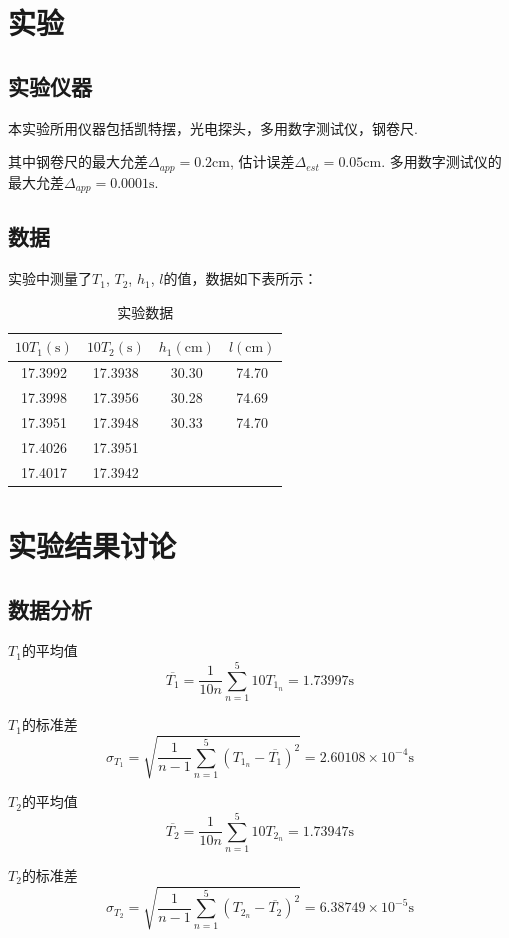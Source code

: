 \documentclass[UTF8]{ctexart}
\begin{document}
\section{实验}
\subsection{实验仪器}
本实验所用仪器包括凯特摆，光电探头，多用数字测试仪，钢卷尺.

其中钢卷尺的最大允差$\Delta_{app}=0.2\mathrm{cm}$, 估计误差$\Delta_{est}=0.05\mathrm{cm}$. 
多用数字测试仪的最大允差$\Delta_{app}=0.0001\mathrm{s}$.
\subsection{数据}
实验中测量了$T_1$, $T_2$, $h_1$, $l$的值，数据如下表所示：
\begin{table}[H]
  \centering
  \begin{tabular}{cccc}
    \hline\hline
    $10T_1(\mathrm{s})$ & $10T_2(\mathrm{s})$ & $h_1(\mathrm{cm})$ & $l(\mathrm{cm})$ \\
    \hline
    17.3992 & 17.3938 & 30.30 & 74.70 \\
    17.3998 & 17.3956 & 30.28 & 74.69 \\
    17.3951 & 17.3948 & 30.33 & 74.70 \\
    17.4026 & 17.3951 & & \\
    17.4017 & 17.3942 & & \\
    \hline\hline
  \end{tabular}
  \caption{实验数据}
\end{table}
\section{实验结果讨论}
\subsection{数据分析}
$T_1$的平均值
\[\overline{T_1} = \frac{1}{10n}\sum_{n=1}^{5} 10 T_{1_n} = 1.73997\mathrm{s}\]

$T_1$的标准差
\[\sigma_{T_1} = \sqrt{\frac{1}{n-1}\sum_{n=1}^{5}\left(T_{1_n}-\overline{T_1}\right)^2} = 2.60108\times 10^{-4}\mathrm{s}\]

$T_2$的平均值
\[\overline{T_2} = \frac{1}{10n}\sum_{n=1}^{5} 10 T_{2_n} = 1.73947\mathrm{s}\]

$T_2$的标准差
\[\sigma_{T_2} = \sqrt{\frac{1}{n-1}\sum_{n=1}^{5}\left(T_{2_n}-\overline{T_2}\right)^2} = 6.38749\times 10^{-5}\mathrm{s}\]
\end{document}
